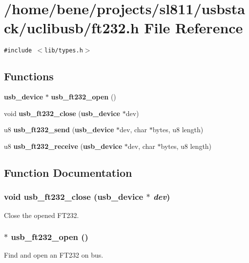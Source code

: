 \section{/home/bene/projects/sl811/usbstack/uclibusb/ft232.h File Reference}
\label{ft232_8h}
{\tt \#include $<$lib/types.h$>$}\par
\subsection*{Functions}
\begin{CompactItemize}
\item 
{\bf usb\_\-device} $\ast$ {\bf usb\_\-ft232\_\-open} ()
\item 
void {\bf usb\_\-ft232\_\-close} ({\bf usb\_\-device} $\ast$dev)
\item 
u8 {\bf usb\_\-ft232\_\-send} ({\bf usb\_\-device} $\ast$dev, char $\ast$bytes, u8 length)
\item 
u8 {\bf usb\_\-ft232\_\-receive} ({\bf usb\_\-device} $\ast$dev, char $\ast$bytes, u8 length)
\end{CompactItemize}


\subsection{Function Documentation}
\subsubsection{\setlength{\rightskip}{0pt plus 5cm}void usb\_\-ft232\_\-close ({\bf usb\_\-device} $\ast$ {\em dev})}\label{ft232_8h_8bde0055ce93f0aa39c74276c0c11228}


Close the opened FT232. 
\subsubsection{$\ast$ usb\_\-ft232\_\-open ()}\label{ft232_8h_03db6551dfa998017bb0d18fe2a4a48e}


Find and open an FT232 on bus. 
